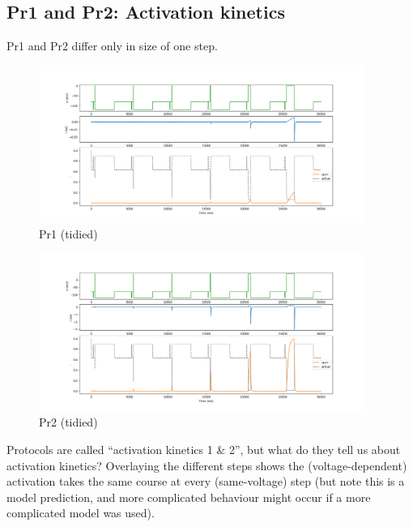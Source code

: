 \documentclass[preprint,authoryear,10pt]{elsarticle}
\begin{document}
%
%
\subsection{Pr1 and Pr2: Activation kinetics}

Pr1 and Pr2 differ only in size of one step.

\begin{figure}[H]
\centerline{
\includegraphics[width=0.95\textwidth]{fig/pr1-modified}
}
\caption{%
Pr1 (tidied)
}
\label{fig:analysis-pr1}
\end{figure}

\begin{figure}[H]
\centerline{
\includegraphics[width=0.95\textwidth]{fig/pr2-modified}
}
\caption{%
Pr2 (tidied)
}
\label{fig:analysis-pr2}
\end{figure}

Protocols are called ``activation kinetics 1 \& 2'', but what do they tell us
 about activation kinetics?
Overlaying the different steps shows the (voltage-dependent) activation takes
 the same course at every (same-voltage) step (but note this is a model
 prediction, and more complicated behaviour might occur if a more complicated
 model was used).
\end{document}

